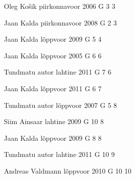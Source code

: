 \documentclass[11pt]{article}
\begin{document}
{Oleg Košik} %
{piirkonnavoor} %
{2006} %
{G 3} %
{3} %
{

\ifEngHint
\fi
}

{Jaan Kalda} %
{piirkonnavoor} %
{2008} %
{G 2} %
{3} %
{

\ifEngHint
\fi
}

{Jaan Kalda} %
{lõppvoor} %
{2009} %
{G 5} %
{4} %
{

\ifEngHint
\fi
}

{Jaan Kalda} %
{lõppvoor} %
{2005} %
{G 6} %
{6} %
{

\ifEngHint
\fi
}

{Tundmatu autor} %
{lahtine} %
{2011} %
{G 7} %
{6} %
{

\ifEngHint
\fi
}

{Jaan Kalda} %
{lõppvoor} %
{2011} %
{G 6} %
{7} %
{

\ifEngHint
\fi
}

{Tundmatu autor} %
{lõppvoor} %
{2007} %
{G 5} %
{8} %
{

\ifEngHint
\fi
}

{Siim Ainsaar} %
{lahtine} %
{2009} %
{G 10} %
{8} %
{

\ifEngHint
\fi
}

{Jaan Kalda} %
{lõppvoor} %
{2009} %
{G 8} %
{8} %
{

\ifEngHint
\fi
}

{Tundmatu autor} %
{lahtine} %
{2011} %
{G 10} %
{9} %
{

\ifEngHint
\fi
}

{Andreas Valdmann} %
{lõppvoor} %
{2010} %
{G 10} %
{10} %
{

\ifEngHint
\fi
}
\end{document}
